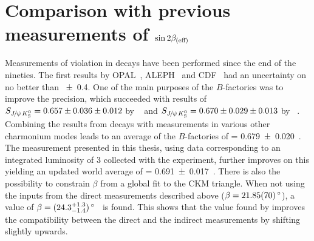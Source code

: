
\section{Comparison with previous measurements of \texorpdfstring{$\sintwobetaoreff$}{sin2beta(eff)}}
\label{sec:discussion:sin2betahistory}

Measurements of \CP violation in \BdToJPsiKS decays have been performed since
the end of the nineties. The first results by OPAL~\cite{OPAL_sin2beta},
ALEPH~\cite{ALEPH_sin2beta} and CDF~\cite{CDF_sin2beta} had an uncertainty on
\sintwobeta no better than \num{\pm0.4}. One of the main purposes of the
$B$-factories was to improve the precision, which succeeded with results of
$\SJpsiKS = \num[parse-numbers=false]{0.657\pm0.036\pm0.012}$ by
\babar~\cite{BaBar_sin2beta} and $\SJpsiKS =
\num[parse-numbers=false]{0.670\pm0.029\pm0.013}$ by
\belle~\cite{Belle_sin2beta}. Combining the results from \BdToJPsiKS decays
with measurements in various other charmonium modes leads to an average of the
$B$-factories of \sintwobeta = \num{0.679\pm0.020}~\cite{HFAG}. The
measurement presented in this thesis, using data corresponding to an
integrated luminosity of \SI{3}{\invfb} collected with the \lhcb experiment,
further improves on this yielding an updated world average of \sintwobeta =
\num{0.691\pm0.017}~\cite{HFAG}. There is also the possibility to constrain
$\beta$ from a global fit to the CKM triangle. When not using the inputs from
the direct measurements described above ($\beta =
\SI{21.85\pm0.7}{\degrees}$), a value of $\beta = (24.3
^{+1.3}_{-1.4})\,\degrees$~\cite{CKMfitter} is found. This shows that the
value found by \lhcb improves the compatibility between the direct and the
indirect measurements by shifting \sintwobeta slightly upwards.

